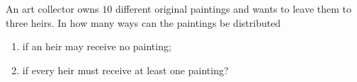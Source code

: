An art collector owns $10$ different original paintings and wants to leave them to three heirs. In how many ways can the paintings be distributed
\begin{enumerate}
\item[(a)] if an heir may receive no painting;
\item[(b)] if every heir must receive at least one painting?
\end{enumerate}
